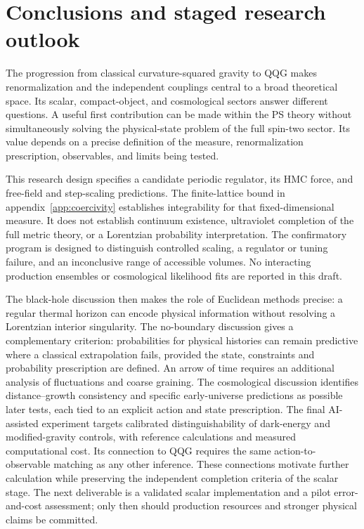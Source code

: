 \section{Conclusions and staged research outlook}
\label{sec:conclusions}

The progression from classical curvature-squared gravity to QQG makes renormalization and the independent couplings central to a broad theoretical space.  Its scalar, compact-object, and cosmological sectors answer different questions.  A useful first contribution can be made within the PS theory without simultaneously solving the physical-state problem of the full spin-two sector.  Its value depends on a precise definition of the measure, renormalization prescription, observables, and limits being tested.

This research design specifies a candidate periodic regulator, its HMC force, and free-field and step-scaling predictions.  The finite-lattice bound in appendix~\ref{app:coercivity} establishes integrability for that fixed-dimensional measure.  It does not establish continuum existence, ultraviolet completion of the full metric theory, or a Lorentzian probability interpretation.  The confirmatory program is designed to distinguish controlled scaling, a regulator or tuning failure, and an inconclusive range of accessible volumes.  No interacting production ensembles or cosmological likelihood fits are reported in this draft.

The black-hole discussion then makes the role of Euclidean methods precise: a regular thermal horizon can encode physical information without resolving a Lorentzian interior singularity.  The no-boundary discussion gives a complementary criterion: probabilities for physical histories can remain predictive where a classical extrapolation fails, provided the state, constraints and probability prescription are defined.  An arrow of time requires an additional analysis of fluctuations and coarse graining.  The cosmological discussion identifies distance--growth consistency and specific early-universe predictions as possible later tests, each tied to an explicit action and state prescription.  The final AI-assisted experiment targets calibrated distinguishability of dark-energy and modified-gravity controls, with reference calculations and measured computational cost.  Its connection to QQG requires the same action-to-observable matching as any other inference.  These connections motivate further calculation while preserving the independent completion criteria of the scalar stage.  The next deliverable is a validated scalar implementation and a pilot error-and-cost assessment; only then should production resources and stronger physical claims be committed.
